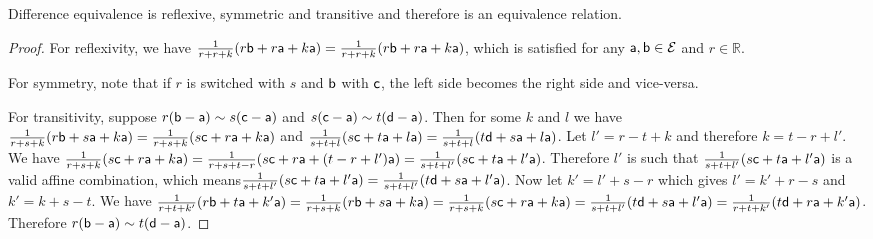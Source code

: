 \begin{mathSection}
	\begin{prop}
		Difference equivalence is reflexive, symmetric and transitive and therefore is an equivalence relation.
	\end{prop}
	
	\begin{proof}
		For reflexivity, we have $\frac{1}{r+r+k} (r \ens[b] + r \ens[a] + k \ens[a]) = \frac{1}{r+r+k} (r \ens[b] + r \ens[a] + k \ens[a])$, which is satisfied for any $\ens[a], \ens[b] \in \Ens$ and $r \in \mathbb{R}$.
		
		For symmetry, note that if $r$ is switched with $s$ and $\ens[b]$ with $\ens[c]$, the left side becomes the right side and vice-versa.
		
		For transitivity, suppose $r(\ens[b] - \ens[a]) \sim s(\ens[c] - \ens[a])$ and $s(\ens[c] - \ens[a]) \sim t(\ens[d] - \ens[a])$. Then for some $k$ and $l$ we have $\frac{1}{r+s+k} (r \ens[b] + s \ens[a] + k \ens[a]) = \frac{1}{r+s+k} (s \ens[c] + r \ens[a] + k \ens[a])$ and $\frac{1}{s+t+l} (s \ens[c] + t \ens[a] + l \ens[a]) = \frac{1}{s+t+l} (t \ens[d] + s \ens[a] + l \ens[a])$. Let $l' = r - t + k$ and therefore $k = t - r + l'$. We have $\frac{1}{r+s+k} (s \ens[c] + r \ens[a] + k \ens[a]) = \frac{1}{r+s+t-r} (s \ens[c] + r \ens[a] + (t-r +l') \ens[a]) = \frac{1}{s+t+l'} (s \ens[c] + t \ens[a] + l' \ens[a])$. Therefore $l'$ is such that $\frac{1}{s+t+l'} (s \ens[c] + t \ens[a] + l' \ens[a])$ is a valid affine combination, which means$\frac{1}{s+t+l'} (s \ens[c] + t \ens[a] + l' \ens[a]) =\frac{1}{s+t+l'} (t \ens[d] + s \ens[a] + l' \ens[a])$. Now let $k' = l' + s -r$ which gives $l' = k' + r -s$ and $k' = k + s - t$. We have $\frac{1}{r+t+k'} (r \ens[b] + t \ens[a] + k' \ens[a]) = \frac{1}{r+s+k} (r \ens[b] + s \ens[a] + k \ens[a]) = \frac{1}{r+s+k} (s \ens[c] + r \ens[a] + k \ens[a]) = \frac{1}{s+t+l'} (t \ens[d] + s \ens[a] + l' \ens[a]) = \frac{1}{r+t+k'} (t \ens[d] + r \ens[a] + k' \ens[a])$. Therefore $r(\ens[b] - \ens[a]) \sim t(\ens[d] - \ens[a])$.
	\end{proof}
	

\end{mathSection}
